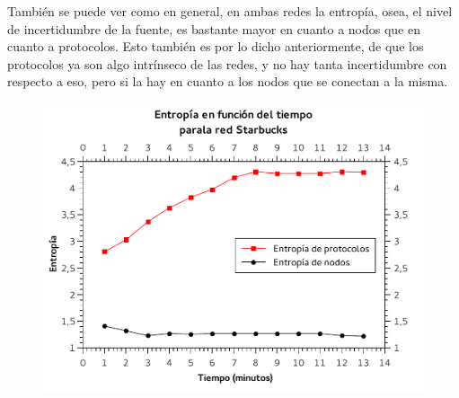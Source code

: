 También se puede ver como en general, en ambas redes la entropía, osea, el nivel de incertidumbre de la fuente, es bastante mayor en cuanto a nodos que en cuanto a protocolos. Esto también es por lo dicho anteriormente, de que los protocolos ya son algo intrínseco de las redes, y no hay tanta incertidumbre con respecto a eso, pero si la hay en cuanto a los nodos que se conectan a la misma.

\begin{figure}[h!]
  \begin{center}
    \includegraphics{graficos/entropia-tiempo-starbucks.pdf}
	\caption{}
    \label{fig:entropy-starbucks}  
  \end{center}
\end{figure}

